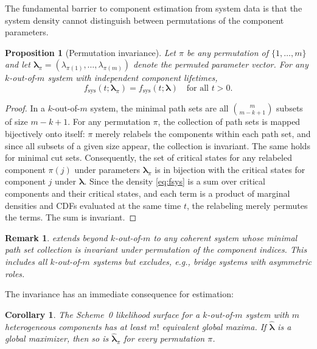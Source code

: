 \documentclass[12pt]{article}
\newtheorem{proposition}{Proposition}
\newtheorem{remark}{Remark}
\newtheorem{corollary}{Corollary}
\newcommand{\fsys}{f_{\mathrm{sys}}}
\newcommand{\blambda}{\boldsymbol{\lambda}}
\begin{document}
The fundamental barrier to component estimation from system data is that the
system density cannot distinguish between permutations of the component
parameters.

\begin{proposition}[Permutation invariance]\label{prop:symmetry}
Let $\pi$ be any permutation of $\{1, \ldots, m\}$ and let $\blambda_\pi =
(\lambda_{\pi(1)}, \ldots, \lambda_{\pi(m)})$ denote the permuted parameter
vector.  For any $k$-out-of-$m$ system with independent component lifetimes,
\begin{equation}\label{eq:symmetry}
  \fsys(t; \blambda_\pi) = \fsys(t; \blambda)
  \quad \text{for all } t > 0.
\end{equation}
\end{proposition}

\begin{proof}
In a $k$-out-of-$m$ system, the minimal path sets are all $\binom{m}{m-k+1}$
subsets of size $m - k + 1$.  For any permutation $\pi$, the collection of
path sets is mapped bijectively onto itself: $\pi$ merely relabels the
components within each path set, and since all subsets of a given size appear,
the collection is invariant.  The same holds for minimal cut sets.  Consequently,
the set of critical states for any relabeled component $\pi(j)$ under
parameters $\blambda_\pi$ is in bijection with the critical states for
component $j$ under $\blambda$.  Since the density \eqref{eq:fsys} is a sum
over critical components and their critical states, and each term is a product
of marginal densities and CDFs evaluated at the same time $t$, the relabeling
merely permutes the terms.  The sum is invariant.
\end{proof}

\begin{remark}
 extends beyond $k$-out-of-$m$ to any coherent system
whose minimal path set collection is invariant under permutation of the
component indices.  This includes all $k$-out-of-$m$ systems but excludes,
e.g., bridge systems with asymmetric roles.
\end{remark}

The invariance has an immediate consequence for estimation:

\begin{corollary}\label{cor:modes}
The Scheme~0 likelihood surface for a $k$-out-of-$m$ system with $m$
heterogeneous components has at least $m!$ equivalent global maxima.  If
$\hat{\blambda}$ is a global maximizer, then so is $\hat{\blambda}_\pi$
for every permutation $\pi$.
\end{corollary}
\end{document}
